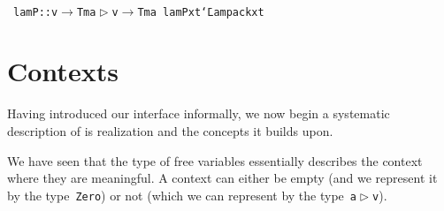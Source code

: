 \documentclass[9pt,authoryear]{sigplanconf}
\begin{document}
{\nopagebreak }

%
%
%
~\\~\vphantom{$\{$}\texttt{lamP}\texttt{\mbox{\hspace{0.50em}}}\texttt{{:}{:}}\texttt{\mbox{\hspace{0.50em}}}\texttt{v}\texttt{\mbox{\hspace{0.50em}}}\texttt{$ \rightarrow $}\texttt{\mbox{\hspace{0.50em}}}\texttt{Tm}\texttt{\mbox{\hspace{0.50em}}}\texttt{\makebox[1.22ex][l]{$ {(} $}}\texttt{a}\texttt{\mbox{\hspace{0.50em}}}\texttt{$ \vartriangleright $}\texttt{\mbox{\hspace{0.50em}}}\texttt{v}\texttt{\makebox[1.22ex][r]{$ {)} $}}\texttt{\mbox{\hspace{0.50em}}}\texttt{$ \rightarrow $}\texttt{\mbox{\hspace{0.50em}}}\texttt{Tm}\texttt{\mbox{\hspace{0.50em}}}\texttt{a}\texttt{{\nopagebreak \newline%
}\vphantom{$\{$}}\texttt{lamP}\texttt{\mbox{\hspace{0.50em}}}\texttt{x}\texttt{\mbox{\hspace{0.50em}}}\texttt{t}\texttt{\mbox{\hspace{0.50em}}}\texttt{{\char `\=}}\texttt{\mbox{\hspace{0.50em}}}\texttt{Lam}\texttt{\mbox{\hspace{0.50em}}}\texttt{\makebox[1.22ex][l]{$ {(} $}}\texttt{pack}\texttt{\mbox{\hspace{0.50em}}}\texttt{x}\texttt{\mbox{\hspace{0.50em}}}\texttt{t}\texttt{\makebox[1.22ex][r]{$ {)} $}}\texttt{{\nopagebreak \newline%
}\vphantom{$\{$}}%


\section{Contexts\label{contextSec}}

%
Having introduced our interface informally, we now begin a
           systematic description of is realization and the concepts it builds upon.%


%
We have seen that the type of free variables essentially describes
    the context where they are meaningful. A context can either be
    empty (and we represent it by the type{~}\texttt{Zero}) or not (which we
    can represent by the type{~}\texttt{a}\texttt{\mbox{\hspace{0.50em}}}\texttt{$ \vartriangleright $}\texttt{\mbox{\hspace{0.50em}}}\texttt{v}).%
\end{document}
